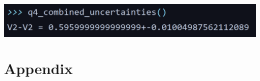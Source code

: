 \documentclass[11pt]{article}
\begin{document}
\begin{enumerate}
        \includegraphics[width=\linewidth]{inc/q4_out.png}
\end{enumerate}

\newpage
\section*{Appendix}
\end{document}
